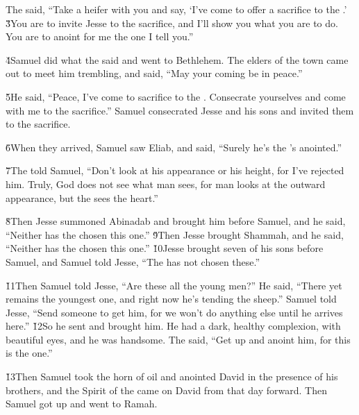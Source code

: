 The  said, ``Take a heifer with you and say, `I've come to offer a sacrifice to the .' \v{3}You are to invite Jesse to the sacrifice, and I'll show you what you are to do. You are to anoint for me the one I tell you.''

\v{4}Samuel did what the  said and went to Bethlehem. The elders of the town came out to meet him trembling, and said, ``May your coming be in peace.''

\v{5}He said, ``Peace, I've come to sacrifice to the . Consecrate yourselves and come with me to the sacrifice.'' Samuel consecrated Jesse and his sons and invited them to the sacrifice.

\v{6}When they arrived, Samuel saw Eliab, and said, ``Surely he's the 's anointed.''

\v{7}The  told Samuel, ``Don't look at his appearance or his height, for I've rejected him. Truly, God does not see what man sees, for man looks at the outward appearance, but the  sees the heart.''

\v{8}Then Jesse summoned Abinadab and brought him before Samuel, and he said, ``Neither has the  chosen this one.'' \v{9}Then Jesse brought Shammah, and he said, ``Neither has the  chosen this one.'' \v{10}Jesse brought seven of his sons before Samuel, and Samuel told Jesse, ``The  has not chosen these.''

\v{11}Then Samuel told Jesse, ``Are these all the young men?'' He said, ``There yet remains the youngest one, and right now he's tending the sheep.'' Samuel told Jesse, ``Send someone to get him, for we won't do anything else until he arrives here.'' \v{12}So he sent and brought him. He had a dark, healthy complexion, with beautiful eyes, and he was handsome. The  said, ``Get up and anoint him, for this is the one.''

\v{13}Then Samuel took the horn of oil and anointed David in the presence of his brothers, and the Spirit of the  came on David from that day forward. Then Samuel got up and went to Ramah.

